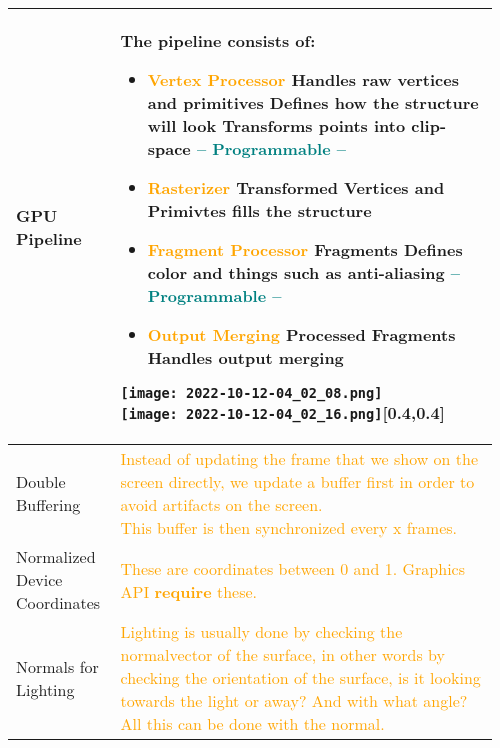\documentclass[main.tex,fontsize=8pt,paper=a4,paper=portrait,DIV=calc,]{scrartcl}
\begin{document}
\begin{table}[ht!]
\begin{tabular}{|m{0.2\linewidth}|m{0.755\linewidth}|}
\hline
GPU Pipeline & \minipg{
The pipeline consists of:\newline
\begin{itemize}
  \item \textcolor{orange}{Vertex Processor}\newline 
    Handles raw vertices and primitives\newline
    Defines how the structure will look\newline
    Transforms points into clip-space\newline
    \textcolor{teal}{-- Programmable --}
  \item \textcolor{orange}{Rasterizer} \newline
    Transformed Vertices and Primivtes\newline
    fills the structure
  \item \textcolor{orange}{Fragment Processor} \newline
    Fragments\newline
    Defines color and things such as anti-aliasing\newline
    \textcolor{teal}{-- Programmable --}
  \item \textcolor{orange}{Output Merging} \newline
    Processed Fragments\newline
    Handles output merging
\end{itemize}
}{\texttt{[image: 2022-10-12-04\_02\_08.png]}\newline
\texttt{[image: 2022-10-12-04\_02\_16.png]}}[0.4,0.4]\\
\hline
  Double Buffering & 
  \textcolor{orange}{Instead of updating the frame that we show on the screen directly, we update a buffer first in order to avoid artifacts on the screen.\newline
  This buffer is then synchronized every x frames.\newline}\\
\hline
  Normalized Device Coordinates & 
  \textcolor{orange}{These are coordinates between 0 and 1. Graphics API \textbf{require} these.}\\
\hline
  Normals for Lighting & 
  \textcolor{orange}{Lighting is usually done by checking the normalvector of the surface, in other words by checking the orientation of the surface, is it looking towards the light or away? And with what angle?\newline
  All this can be done with the normal.}\newline

\end{tabular}
\end{table}
\end{document}
